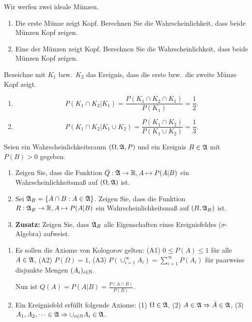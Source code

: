  Wir werfen zwei ideale Münzen.
\begin{enumerate}
    \item Die erste Münze zeigt Kopf. Berechnen Sie die Wahrscheinlichkeit,
        dass beide Münzen Kopf zeigen.

    \item Eine der Münzen zeigt Kopf. Berechnen Sie die Wahrscheinlichkeit,
        dass beide Münzen Kopf zeigen.
\end{enumerate}

\solution Bezeichne mit $K_1$ bzw.\ $K_2$ das Ereignis, dass die erste
bzw.\ die zweite Münze Kopf zeigt. 
\begin{enumerate}
    \item \begin{equation*}
            P( K_1 \cap K_2 | K_1 ) = \frac{ P( K_1 \cap K_2 \cap K_1) }{ P(K_1)} = \frac{1}{2}.
        \end{equation*}

    \item \begin{equation*}
            P( K_1 \cap K_2 | K_1 \cup K_2 ) = \frac{ P( K_1 \cap K_2) }{ P(K_1 \cup K_2) }
            = \frac{1}{3}. 
        \end{equation*}
\end{enumerate}


Seien ein Wahrscheinlichkeitsraum $(\Omega, \mathfrak A, P)$ und ein Ereignis $B\in\mathfrak A$
mit $P(B)>0$ gegeben. 
\begin{enumerate}
    \item Zeigen Sie, dass die Funktion $Q: \mathfrak A \to \mathbb R, A \mapsto P(A|B)$ ein
        Wahrscheinlichkeitsmaß auf $(\Omega, \mathfrak A)$ ist.
    \item Sei $\mathfrak A_B = \left\{ A \cap B : A\in \mathfrak A \right\}$. Zeigen Sie, dass
        die Funktion $R: \mathfrak A_B \to \mathbb R, A \mapsto P(A|B)$ ein Wahrscheinlichkeitsmaß
        auf $\left( B, \mathfrak A_B \right)$ ist. 
    \item \textbf{Zusatz:} Zeigen Sie, dass $\mathfrak A_B$ alle Eigenschaften eines Ereignisfeldes ($\sigma$-Algebra) aufweist.
\end{enumerate}

\solution
\begin{enumerate}
    \item Es sollen die Axiome von Kologorov gelten: (A1) $0 \leq P(A) \leq 1$
        für alle $A\in \mathfrak A$, (A2) $P(\Omega)=1$, (A3) $P\left(
        \cup_{i=1}^{\infty} A_i \right) = \sum_{i=1}^{\infty} P(A_i)$ für
        paarweise disjunkte Mengen $(A_i)_{i\in \mathbb N}$. 

        Nun ist $Q(A) = P( A | B) =  \frac{P(A \cap B)}{ P(B)}$.

    \item Ein Ereignisfeld erfüllt folgende Axiome: (1) $\Omega \in \mathfrak A$, (2)
        $A \in \mathfrak A \Rightarrow \bar A \in \mathfrak A$, (3) $A_1, A_2, \dots \in \mathfrak A \Rightarrow
        \cup_{i\in\mathbb N} A_i \in \mathfrak A$. 
\end{enumerate}


